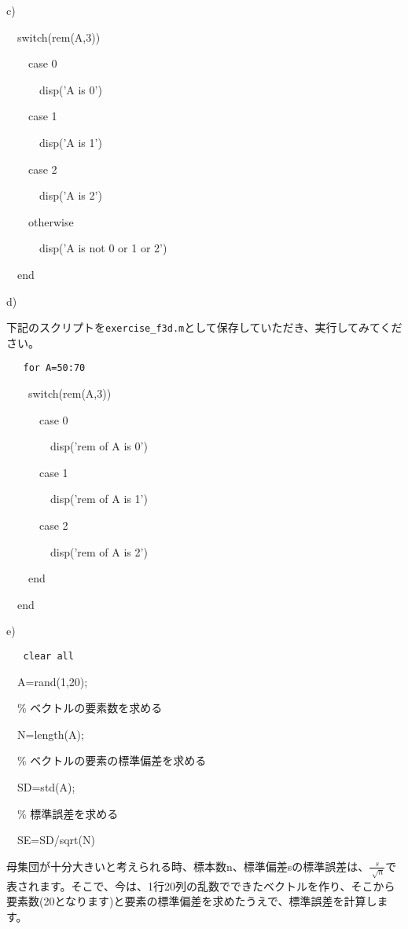 \documentclass{jsarticle}
\begin{document}
\bigskip

c)

{\tt

\ \ switch(rem(A,3))

\ \ \ \ case 0

\ \ \ \ \ \ disp('A is 0')

\ \ \ \ case 1

\ \ \ \ \ \ disp('A is 1')

\ \ \ \ case 2

\ \ \ \ \ \ disp('A is 2')

\ \ \ \ otherwise

\ \ \ \ \ \ disp('A is not 0 or 1 or 2')

\ \ end
}

\bigskip

d)

\begin{screen}
下記のスクリプトを{\tt exercise\_f3d.m}として保存していただき、実行してみてください。
\end{screen}

{\tt
\ \ for A=50:70

\ \ \ \ switch(rem(A,3))

\ \ \ \ \ \ case 0

\ \ \ \ \ \ \ \ disp('rem of A is 0')

\ \ \ \ \ \ case 1

\ \ \ \ \ \ \ \ disp('rem of A is 1')

\ \ \ \ \ \ case 2

\ \ \ \ \ \ \ \ disp('rem of A is 2')

\ \ \ \ end

\ \ end
}

\bigskip

e)

{\tt
\ \ clear all

\ \ A=rand(1,20);

\ \ \% ベクトルの要素数を求める

\ \ N=length(A);

\ \ \% ベクトルの要素の標準偏差を求める

\ \ SD=std(A);

\ \ \% 標準誤差を求める

\ \ SE=SD/sqrt(N)
}


\begin{screen}
母集団が十分大きいと考えられる時、標本数n、標準偏差sの標準誤差は、$\frac{s}{\sqrt[]{n}}$で表されます。そこで、今は、1行20列の乱数でできたベクトルを作り、そこから要素数(20となります)と要素の標準偏差を求めたうえで、標準誤差を計算します。
\end{screen}
\end{document}
